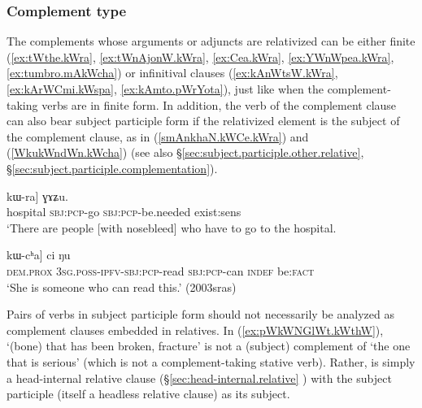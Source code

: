  
\subsubsection{Complement type} \label{sec:relativization.complement.type}
The complements whose arguments or adjuncts are relativized can be either finite (\ref{ex:tWthe.kWra}, \ref{ex:tWnAjonW.kWra}, \ref{ex:Cea.kWra}, \ref{ex:YWnWpea.kWra}, \ref{ex:tumbro.mAkWcha}) or infinitival clauses (\ref{ex:kAnWtsW.kWra}, \ref{ex:kArWCmi.kWspa}, \ref{ex:kAmto.pWrYota}), just like when the com\-ple\-ment-taking verbs are in finite form. In addition, the verb of the complement clause can also bear subject participle form if the relativized element is the subject of the complement clause, as in (\ref{smAnkhaN.kWCe.kWra}) and (\ref{WkukWndWn.kWcha}) (see also §\ref{sec:subject.participle.other.relative}, §\ref{sec:subject.participle.complementation}).

\begin{exe}
\ex \label{smAnkhaN.kWCe.kWra}
\gll  [[smɤnkʰaŋ kɯ-ɕe] kɯ-ra] ɣɤʑu. \\
hospital \textsc{sbj}:\textsc{pcp}-go \textsc{sbj}:\textsc{pcp}-be.needed exist:sens \\
\glt `There are people [with nosebleed] who have to go to the hospital. \\
\end{exe}
 
\begin{exe}
\ex \label{WkukWndWn.kWcha}
\gll  [[kɯki ɯ-ku-kɯ-ndɯn] kɯ-cʰa] ci ŋu \\
\textsc{dem}.\textsc{prox} \textsc{3sg}.\textsc{poss}-\textsc{ipfv}-\textsc{sbj}:\textsc{pcp}-read \textsc{sbj}:\textsc{pcp}-can \textsc{indef} be:\textsc{fact} \\
\glt `She is someone who can read this.' (2003sras)
\end{exe}

Pairs of verbs in subject participle form should not necessarily be analyzed as complement clauses embedded in relatives. In (\ref{ex:pWkWNGlWt.kWthW}),  `(bone) that has been broken, fracture' is not a (subject) complement of   `the one that is serious' (which is not a com\-ple\-ment-taking stative verb). Rather,  is simply a head-internal relative clause (§\ref{sec:head-internal.relative} ) with the subject participle (itself a headless relative clause)  as its subject. 

